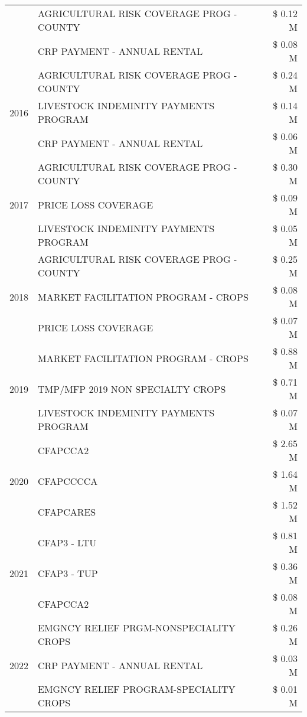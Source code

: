 \begin{tabular}{llr}
 & AGRICULTURAL RISK COVERAGE PROG - COUNTY & \$ 0.12 M \\
 & CRP PAYMENT - ANNUAL RENTAL & \$ 0.08 M \\
\cline{1-3}
\multirow[t]{3}{*}{2016} & AGRICULTURAL RISK COVERAGE PROG - COUNTY & \$ 0.24 M \\
 & LIVESTOCK INDEMINITY PAYMENTS PROGRAM & \$ 0.14 M \\
 & CRP PAYMENT - ANNUAL RENTAL & \$ 0.06 M \\
\cline{1-3}
\multirow[t]{3}{*}{2017} & AGRICULTURAL RISK COVERAGE PROG - COUNTY & \$ 0.30 M \\
 & PRICE LOSS COVERAGE & \$ 0.09 M \\
 & LIVESTOCK INDEMINITY PAYMENTS PROGRAM & \$ 0.05 M \\
\cline{1-3}
\multirow[t]{3}{*}{2018} & AGRICULTURAL RISK COVERAGE PROG - COUNTY & \$ 0.25 M \\
 & MARKET FACILITATION PROGRAM - CROPS & \$ 0.08 M \\
 & PRICE LOSS COVERAGE & \$ 0.07 M \\
\cline{1-3}
\multirow[t]{3}{*}{2019} & MARKET FACILITATION PROGRAM - CROPS & \$ 0.88 M \\
 & TMP/MFP 2019 NON SPECIALTY CROPS & \$ 0.71 M \\
 & LIVESTOCK INDEMINITY PAYMENTS PROGRAM & \$ 0.07 M \\
\cline{1-3}
\multirow[t]{3}{*}{2020} & CFAPCCA2 & \$ 2.65 M \\
 & CFAPCCCCA & \$ 1.64 M \\
 & CFAPCARES & \$ 1.52 M \\
\cline{1-3}
\multirow[t]{3}{*}{2021} & CFAP3 - LTU & \$ 0.81 M \\
 & CFAP3 - TUP & \$ 0.36 M \\
 & CFAPCCA2 & \$ 0.08 M \\
\cline{1-3}
\multirow[t]{3}{*}{2022} & EMGNCY RELIEF PRGM-NONSPECIALITY CROPS & \$ 0.26 M \\
 & CRP PAYMENT - ANNUAL RENTAL & \$ 0.03 M \\
 & EMGNCY RELIEF PROGRAM-SPECIALITY CROPS & \$ 0.01 M \\
\cline{1-3}
\bottomrule
\end{tabular}
